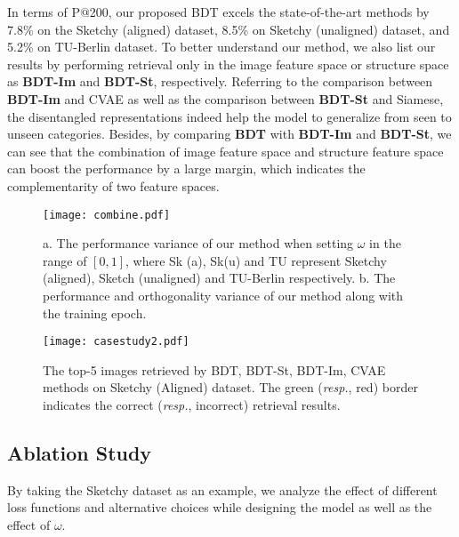 \documentclass[10pt,twocolumn,letterpaper]{article}
\begin{document}
In terms of P@200, our proposed BDT excels the state-of-the-art methods by 7.8\% on the Sketchy (aligned) dataset, 8.5\% on Sketchy (unaligned) dataset, and 5.2\% on TU-Berlin dataset. 
To better understand our method, we also list our results by performing retrieval only in the image feature space or structure space as \textbf{BDT-Im} and \textbf{BDT-St}, respectively. Referring to the comparison between \textbf{BDT-Im} and CVAE as well as the comparison between \textbf{BDT-St} and Siamese, the disentangled representations indeed help the model to generalize from seen to unseen categories. 
Besides, by comparing \textbf{BDT} with \textbf{BDT-Im} and \textbf{BDT-St}, we can see that the combination of image feature space and structure feature space can boost the performance by a large margin, which indicates the complementarity of two feature spaces.

\begin{figure}
\begin{center}
\texttt{[image: combine.pdf]}
\end{center}
\vspace{-10pt}
   \caption{a. The performance variance of our method when setting $\omega$ in the range of $[0, 1]$, where Sk (a), Sk(u) and TU represent Sketchy (aligned), Sketch (unaligned) and TU-Berlin respectively. b. The performance and orthogonality variance of our method along with the training epoch.}
\label{fig:orth}
\vspace{-10pt}
\end{figure}

\begin{figure*}
\begin{center}
\texttt{[image: casestudy2.pdf]}
\end{center}
\vspace{-10pt}
   \caption{The top-5 images retrieved by BDT, BDT-St, BDT-Im, CVAE methods on Sketchy (Aligned) dataset. The green (\emph{resp.}, red) border indicates the correct (\emph{resp.}, incorrect) retrieval results.}
\label{fig:case}
\vspace{-14pt}
\end{figure*}

\subsection{Ablation Study}
By taking the Sketchy dataset as an example, we analyze the effect of different loss functions and alternative choices while designing the model as well as the effect of $\omega$.
\end{document}

